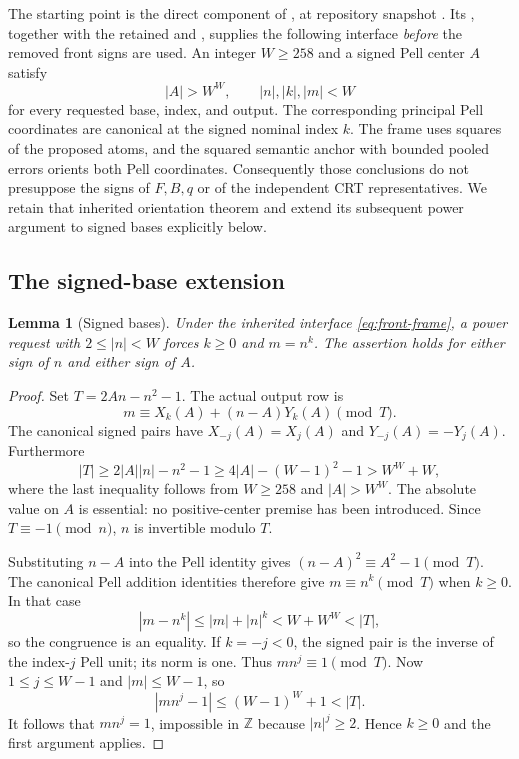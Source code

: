 \documentclass[11pt,letterpaper]{article}
\newcommand{\Z}{\mathbb Z}
\newtheorem{lemma}[theorem]{Lemma}
\theoremstyle{definition}
\theoremstyle{remark}
\begin{document}
The starting point is the direct component of
, at repository
snapshot .
Its , together with the retained
 and
, supplies the following interface
\emph{before} the removed front signs are used.  An integer $W\geq258$
and a signed Pell center $A$ satisfy
\begin{equation}
 |A|>W^W,\qquad |n|,|k|,|m|<W
 \label{eq:front-frame}
\end{equation}
for every requested base, index, and output.  The corresponding principal
Pell coordinates are canonical at the signed nominal index $k$.
The frame uses squares of the proposed atoms, and the squared semantic
anchor with bounded pooled errors orients both Pell coordinates.
Consequently those conclusions do not presuppose the signs of $F,B,q$
or of the independent CRT representatives.  We retain that inherited
orientation theorem and extend its subsequent power argument to signed
bases explicitly below.

\subsection{The signed-base extension}

\begin{lemma}[Signed bases]
\label{lem:front-signed}
Under the inherited interface \eqref{eq:front-frame}, a power request
with $2\leq |n|<W$ forces $k\geq0$ and $m=n^k$.  The assertion holds
for either sign of $n$ and either sign of $A$.
\end{lemma}
\begin{proof}
Set $T=2An-n^2-1$.  The actual output row is
\[
 m\equiv X_k(A)+(n-A)Y_k(A)\pmod T.
\]
The canonical signed pairs have
$X_{-j}(A)=X_j(A)$ and $Y_{-j}(A)=-Y_j(A)$.
Furthermore
\[
 |T|\geq2|A||n|-n^2-1
       \geq4|A|-(W-1)^2-1>W^W+W,
\]
where the last inequality follows from $W\geq258$ and $|A|>W^W$.
The absolute value on $A$ is essential: no positive-center premise has
been introduced.  Since $T\equiv-1\pmod n$, $n$ is invertible modulo $T$.

Substituting $n-A$ into the Pell identity gives
$(n-A)^2\equiv A^2-1\pmod T$.  The canonical Pell addition identities
therefore give $m\equiv n^k\pmod T$ when $k\geq0$.  In that case
\[
 |m-n^k|\leq |m|+|n|^k<W+W^W<|T|,
\]
so the congruence is an equality.  If $k=-j<0$, the signed pair is the
inverse of the index-$j$ Pell unit; its norm is one.  Thus
$mn^j\equiv1\pmod T$.  Now $1\leq j\leq W-1$ and $|m|\leq W-1$, so
\[
 |mn^j-1|\leq(W-1)^W+1<|T|.
\]
It follows that $mn^j=1$, impossible in $\Z$ because $|n|^j\geq2$.
Hence $k\geq0$ and the first argument applies.
\end{proof}
\end{document}
